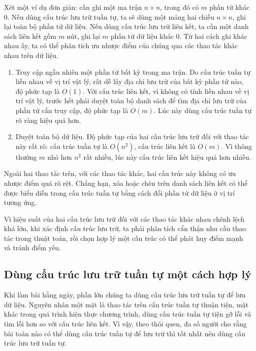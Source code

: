 \documentclass[11pt]{article}
\begin{document}
Xét một ví dụ đơn giản: cần ghi một ma trận \(n\times n\), trong đó có \(m\)
phần tử khác \(0\). Nếu dùng cấu trúc lưu trữ tuần tự, ta sẽ dùng một mảng
hai chiều \(n\times n\), ghi lại toàn bộ phần tử dữ liệu. Nếu dùng cấu trúc
lưu trữ liên kết, ta cần một danh sách liên kết gồm \(m\) nút, ghi lại \(m\)
phần tử dữ liệu khác \(0\). Từ hai cách ghi khác nhau ấy, ta có thể phân tích
ưu nhược điểm của chúng qua các thao tác khác nhau trên dữ liệu.

\begin{enumerate}
  \item Truy cập ngẫu nhiên một phần tử bất kỳ trong ma trận. Do cấu trúc tuần
  tự liền nhau về vị trí vật lý, rất dễ lấy địa chỉ lưu trữ của bất kỳ phần
  tử nào, độ phức tạp là \(O(1)\). Với cấu trúc liên kết, vì không có tính
  liền nhau về vị trí vật lý, trước hết phải duyệt toàn bộ danh sách để tìm
  địa chỉ lưu trữ của phần tử cần truy cập, độ phức tạp là \(O(m)\). Lúc này
  dùng cấu trúc tuần tự rõ ràng hiệu quả hơn.
  \item Duyệt toàn bộ dữ liệu. Độ phức tạp của hai cấu trúc lưu trữ đối với
  thao tác này rất rõ: cấu trúc tuần tự là \(O(n^2)\), cấu trúc liên kết là
  \(O(m)\). Vì thông thường \(m\) nhỏ hơn \(n^2\) rất nhiều, lúc này cấu trúc
  liên kết hiệu quả hơn nhiều.
\end{enumerate}

Ngoài hai thao tác trên, với các thao tác khác, hai cấu trúc này không có ưu
nhược điểm quá rõ rệt. Chẳng hạn, xóa hoặc chèn trên danh sách liên kết có
thể được biểu diễn trong cấu trúc tuần tự bằng cách đổi phần tử dữ liệu ở vị
trí tương ứng.

Vì hiệu suất của hai cấu trúc lưu trữ đối với các thao tác khác nhau chênh
lệch khá lớn, khi xác định cấu trúc lưu trữ, ta phải phân tích cẩn thận nhu
cầu thao tác trong thuật toán, rồi chọn hợp lý một cấu trúc có thể phát huy
điểm mạnh và tránh điểm yếu.

\subsection{Dùng cấu trúc lưu trữ tuần tự một cách hợp lý}

Khi làm bài hằng ngày, phần lớn chúng ta dùng cấu trúc lưu trữ tuần tự để lưu
dữ liệu. Nguyên nhân một mặt là thao tác trên cấu trúc tuần tự thuận tiện,
mặt khác trong quá trình hiện thực chương trình, dùng cấu trúc tuần tự tiện
gỡ lỗi và tìm lỗi hơn so với cấu trúc liên kết. Vì vậy, theo thói quen, đa số
người cho rằng bài toán nào có thể dùng cấu trúc tuần tự để lưu trữ thì tốt
nhất nên dùng cấu trúc lưu trữ tuần tự.
\end{document}
